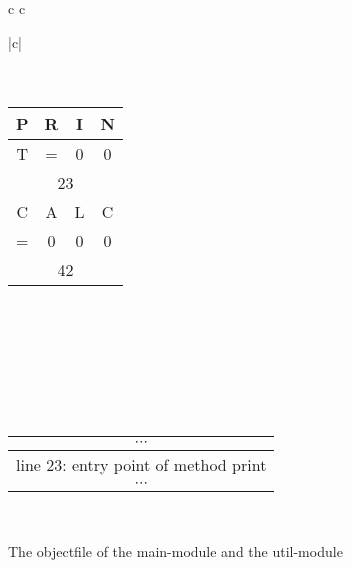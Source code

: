 \begin{figure}[h]
\begin{tabular}{c c}
		\begin{tabular}{|c|}
			\hline
			0 \\
			 \\
			\hline
			6 \\
			\hline
			\begin{tabular}{|c|c|c|c|}
				P & R & I & N \\
				\hline
				T &  = &  0 & 0 \\
				\hline 
				\multicolumn{4}{|c|}{23} \\
				\hline
				C & A & L & C \\
				\hline
				= &  0 &  0 & 0 \\
				\hline 
				\multicolumn{4}{|c|}{42} \\
			\end{tabular}
			\\ 
			 \\
			\hline
			\\ \\ \\ \\
			\hline
			\begin{tabular}{c}
				$ \cdots $ \\
				\hline
				line 23: entry point of method print \\
				\hline
				$ \cdots $ \\
			\end{tabular}
			\\
			\hline 
		\end{tabular}

\end{tabular}
\caption{The objectfile of the main-module and the util-module}
\label{linker:example:linker}
\end{figure}

